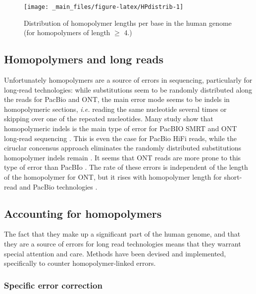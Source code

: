 \documentclass[
  11pt,
  twoside]{scrbook}
\begin{document}
\begin{figure}

{\centering \texttt{[image: \_main\_files/figure-latex/HPdistrib-1]} 

}

\caption{Distribution of homopolymer lengths per base in the human genome (for homopolymers of length $\geq$ 4.)}\label{fig:HPdistrib}
\end{figure}

\hypertarget{homopolymers-and-long-reads}{%
\subsection{Homopolymers and long reads}\label{homopolymers-and-long-reads}}

Unfortunately homopolymers are a source of errors in sequencing, particularly for long-read technologies: while substitutions seem to be randomly distributed along the reads for PacBio and ONT, the main error mode seems to be indels in homopolymeric sections, \emph{i.e.} reading the same nucleotide several times or skipping over one of the repeated nucleotides. Many study show that homopolymeric indels is the main type of error for PacBIO SMRT and ONT long-read sequencing \autocite{delahaye2021,goodwin2015,dohmBenchmarkingLongreadCorrection2020,weirather2017}. This is even the case for PacBio HiFi reads, while the ciruclar concensus approach eliminates the randomly distributed substitutions homopolymer indels remain \autocite{wenger2019}. It seems that ONT reads are more prone to this type of error than PacBIo \autocite{logsdonLongreadHumanGenome2020}. The rate of these errors is independent of the length of the homopolymer for ONT, but it rises with homopolymer length for short-read and PacBio technologies \autocite{fooxPerformanceAssessmentDNA2021}.

\hypertarget{accounting-for-homopolymers}{%
\subsection{Accounting for homopolymers}\label{accounting-for-homopolymers}}

The fact that they make up a significant part of the human genome, and that they are a source of errors for long read technologies means that they warrant special attention and care. Methods have been devised and implemented, specifically to counter homopolymer-linked errors.

\hypertarget{specific-error-correction}{%
\subsubsection{Specific error correction}\label{specific-error-correction}}
\end{document}
